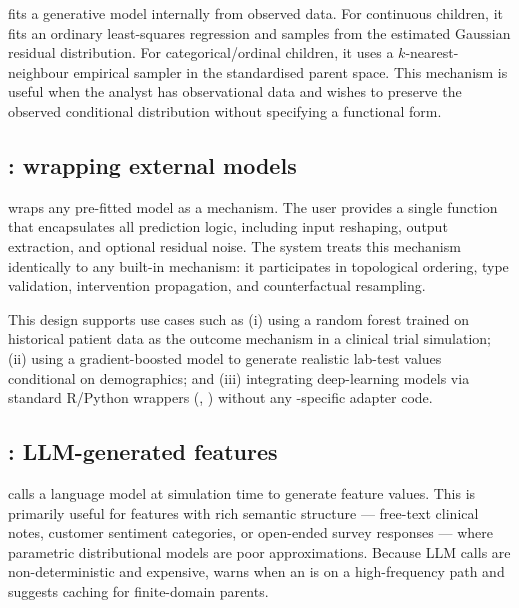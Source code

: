 \documentclass[article]{jss}
\begin{document}
 fits a generative model internally from observed data. For continuous children, it fits an ordinary least-squares regression and samples from the estimated Gaussian residual distribution. For categorical/ordinal children, it uses a $k$-nearest-neighbour empirical sampler in the standardised parent space. This mechanism is useful when the analyst has observational data and wishes to preserve the observed conditional distribution without specifying a functional form.

\subsection{: wrapping external models}

 wraps any pre-fitted model as a mechanism. The user provides a single function  that encapsulates all prediction logic, including input reshaping, output extraction, and optional residual noise. The system treats this mechanism identically to any built-in mechanism: it participates in topological ordering, type validation, intervention propagation, and counterfactual resampling.

This design supports use cases such as (i) using a random forest trained on historical patient data as the outcome mechanism in a clinical trial simulation; (ii) using a gradient-boosted model to generate realistic lab-test values conditional on demographics; and (iii) integrating deep-learning models via standard R/Python wrappers (, ) without any -specific adapter code.

\subsection{: LLM-generated features}

 calls a language model at simulation time to generate feature values. This is primarily useful for features with rich semantic structure --- free-text clinical notes, customer sentiment categories, or open-ended survey responses --- where parametric distributional models are poor approximations. Because LLM calls are non-deterministic and expensive,  warns when an  is on a high-frequency path and suggests caching for finite-domain parents.
\end{document}
